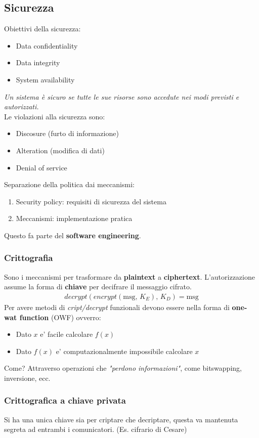 \documentclass[a4paper,12pt]{article}
\begin{document}
\subsection{Sicurezza}
Obiettivi della sicurezza:
\begin{itemize}
  \item Data confidentiality
  \item Data integrity
  \item System availability
\end{itemize}
\textit{Un sistema è sicuro se tutte le sue risorse sono accedute
nei modi previsti e autorizzati.}\\
Le violazioni alla sicurezza sono:
\begin{itemize}
  \item Discosure (furto di informazione)
  \item Alteration (modifica di dati)
  \item Denial of service
\end{itemize}
Separazione della politica dai meccanismi:
\begin{enumerate}
  \item Security policy: requisiti di sicurezza del sistema
  \item Meccanismi: implementazione pratica
\end{enumerate}
Questo fa parte del \textbf{software engineering}.
\subsubsection{Crittografia}
Sono i meccanismi per trasformare da \textbf{plaintext} a \textbf{ciphertext}. L'autorizzazione assume la forma di \textbf{chiave} per decifrare il messaggio cifrato.
\begin{align*}
  decrypt(encrypt(\text{msg}, \, K_E), \, K_D) = \text{msg}
\end{align*}
Per avere metodi di \textit{cript/decrypt} funzionali devono essere nella forma di \textbf{one-wat function} (OWF) ovverro:
\begin{itemize}
  \item Dato $x$ e' facile calcolare $f(x)$
  \item Dato $f(x)$ e' computazionalmente impossibile calcolare $x$
\end{itemize}
Come? Attraverso operazioni che \textit{"perdono informazioni"}, come bitswapping, inversione, ecc.
\subsubsection{Crittografica a chiave privata}
Si ha una unica chiave sia per criptare che decriptare, questa va mantenuta segreta ad entrambi i comunicatori. (Es. cifrario di Cesare)\\
\vspace{1px}\\
\end{document}
